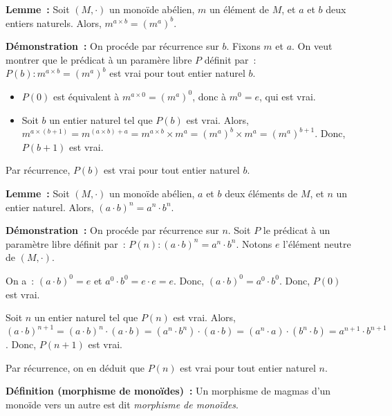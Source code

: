     \done

\medskip

\noindent\textbf{Lemme :} Soit $(M,\cdot)$ un monoïde abélien, $m$ un élément de $M$, et $a$ et $b$ deux entiers naturels. 
    Alors, $m^{a \times b} = (m^a)^b$.

\medskip

\noindent\textbf{Démonstration :} On procéde par récurrence sur $b$.
    Fixons $m$ et $a$.
    On veut montrer que le prédicat à un paramère libre $P$ définit par : $P(b): m^{a \times b} = (m^a)^b$ est vrai pour tout entier naturel $b$.
    \begin{itemize}[nosep]
        \item $P(0)$ est équivalent à $m^{a \times 0} = (m^a)^0$, donc à $m^0 = e$, qui est vrai.
        \item Soit $b$ un entier naturel tel que $P(b)$ est vrai. 
            Alors, $m^{a \times (b+1)} = m^{(a \times b) + a} = m^{a \times b} \times m^a = (m^a)^b \times m^a = (m^a)^{b+1}$.
            Donc, $P(b+1)$ est vrai.
    \end{itemize}
    Par récurrence, $P(b)$ est vrai pour tout entier naturel $b$.

    \done

\medskip

\noindent\textbf{Lemme :} Soit $(M, \cdot)$ un monoïde abélien, $a$ et $b$ deux éléments de $M$, et $n$ un entier naturel. 
    Alors, $(a \cdot b)^n = a^n \cdot b^n$.

\medskip

\noindent\textbf{Démonstration :} On procéde par récurrence sur $n$.
    Soit $P$ le prédicat à un paramètre libre définit par : $P(n): (a \cdot b)^n = a^n \cdot b^n$.
    Notons $e$ l'élément neutre de $(M, \cdot)$.

    On a : $(a \cdot b)^0 = e$ et $a^0 \cdot b^0 = e \cdot e = e$.
    Donc, $(a \cdot b)^0 = a^0 \cdot b^0$.
    Donc, $P(0)$ est vrai.

    Soit $n$ un entier naturel tel que $P(n)$ est vrai. 
    Alors, $(a \cdot b)^{n+1} = (a \cdot b)^n \cdot (a \cdot b) = (a^n \cdot b^n) \cdot (a \cdot b) = (a^n \cdot a) \cdot (b^n \cdot b) = a^{n+1} \cdot b^{n+1}$.
    Donc, $P(n+1)$ est vrai.

    Par récurrence, on en déduit que $P(n)$ est vrai pour tout entier naturel $n$.

    \done

\medskip

\noindent\textbf{Définition (morphisme de monoïdes) :} Un morphisme de magmas d'un monoïde vers un autre est dit \textit{morphisme de monoïdes}.

